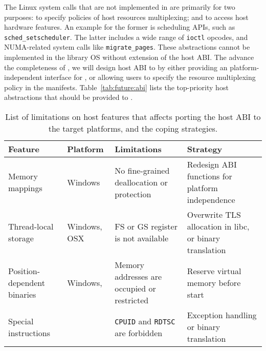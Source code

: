 The Linux system calls that are not implemented in \graphene{}
are primarily for two purposes:
to specify policies of host resources multiplexing;
and to access host hardware features.
An example for the former is scheduling APIs, such as {\tt sched\_setscheduler}.
The latter includes
a wide range of {\tt ioctl} opcodes,
and NUMA-related system calls like {\tt migrate\_pages}.
These abstractions cannot be implemented in the library OS
without extension of the host ABI.
The advance the completeness of \graphene{},
we will design host ABI to by
either providing an platform-independent interface
for \picoprocs{},
or allowing users to specify the resource multiplexing policy in the manifests.
Table~\ref{tab:future:abi} lists the top-priority host abstractions
that should be provided to \picoprocs{}.


\begin{table}[t]
\footnotesize
\centering
\begin{tabular}{|p{1.2in}|>{\raggedright\arraybackslash}p{0.8in}|>{\raggedright\arraybackslash}p{1.6in}|>{\raggedright\arraybackslash}p{2.2in}|}
\hline
{\bf Feature} & {\bf Platform} & {\bf Limitations} & {\bf Strategy} \\
\hline
Memory mappings & Windows & No fine-grained deallocation or protection & Redesign ABI functions for platform independence \\
\hline
Thread-local storage & Windows, OSX & FS or GS register is not available & Overwrite TLS allocation in libc, or binary translation \\
\hline
Position-dependent binaries & Windows, \intel{} \sgx{} & Memory addresses are occupied or restricted & Reserve virtual memory before \picoprocs{} start \\
\hline
Special instructions & \intel{} \sgx{} & {\tt CPUID} and {\tt RDTSC} are forbidden & Exception handling or binary translation \\
\hline
\end{tabular}
\caption[List of platform limitations affecting host ABI porting]
{List of limitations on host features that affects porting the host ABI to the target platforms,
and the coping strategies.}
\label{tab:future:abi-limit}
\end{table}

